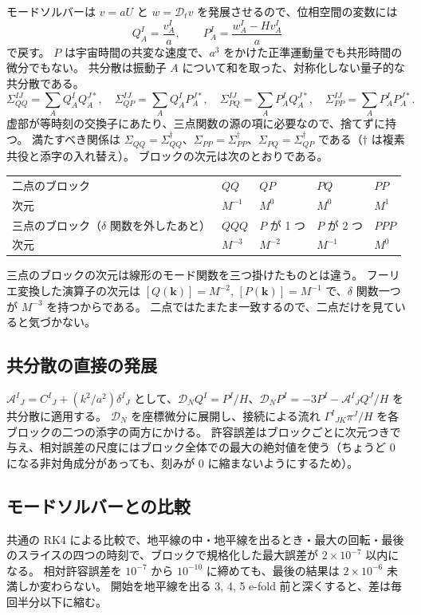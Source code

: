 \documentclass[a4paper,11pt]{ltjsarticle}
\newcommand{\Dt}{\mathcal{D}_t}
\newcommand{\DN}{\mathcal{D}_N}
\begin{document}
モードソルバーは $v=aU$ と $w=\Dt v$ を発展させるので、位相空間の変数には
\[
Q^I_A=\frac{v^I_A}{a},\qquad P^I_A=\frac{w^I_A-Hv^I_A}{a}
\]
で戻す。
$P$ は宇宙時間の共変な速度で、$a^3$ をかけた正準運動量でも共形時間の微分でもない。
共分散は振動子 $A$ について和を取った、対称化しない量子的な共分散である。
\[
\Sigma_{QQ}^{IJ}=\sum_AQ^I_AQ^{J*}_A,\quad
\Sigma_{QP}^{IJ}=\sum_AQ^I_AP^{J*}_A,\quad
\Sigma_{PQ}^{IJ}=\sum_AP^I_AQ^{J*}_A,\quad
\Sigma_{PP}^{IJ}=\sum_AP^I_AP^{J*}_A .
\]
虚部が等時刻の交換子にあたり、三点関数の源の項に必要なので、捨てずに持つ。
満たすべき関係は $\Sigma_{QQ}=\Sigma_{QQ}^\dagger$、$\Sigma_{PP}=\Sigma_{PP}^\dagger$、$\Sigma_{PQ}=\Sigma_{QP}^\dagger$ である（$\dagger$ は複素共役と添字の入れ替え）。
ブロックの次元は次のとおりである。
\begin{center}
\begin{tabular}{lllll}
\toprule
二点のブロック & $QQ$ & $QP$ & $PQ$ & $PP$ \\
次元 & $M^{-1}$ & $M^0$ & $M^0$ & $M^1$ \\
\midrule
三点のブロック（$\delta$ 関数を外したあと） & $QQQ$ & $P$ が 1 つ & $P$ が 2 つ & $PPP$ \\
次元 & $M^{-3}$ & $M^{-2}$ & $M^{-1}$ & $M^0$ \\
\bottomrule
\end{tabular}
\end{center}
三点のブロックの次元は線形のモード関数を三つ掛けたものとは違う。
フーリエ変換した演算子の次元は $[Q(\mathbf k)]=M^{-2}$, $[P(\mathbf k)]=M^{-1}$ で、$\delta$ 関数一つが $M^{-3}$ を持つからである。
二点ではたまたま一致するので、二点だけを見ていると気づかない。

\subsection{共分散の直接の発展}
$\mathcal A^I{}_J=C^I{}_J+(k^2/a^2)\delta^I{}_J$ として、$\DN Q^I=P^I/H$、$\DN P^I=-3P^I-\mathcal A^I{}_JQ^J/H$ を共分散に適用する。
$\DN$ を座標微分に展開し、接続による流れ $\Gamma^I{}_{JK}\pi^J/H$ を各ブロックの二つの添字の両方にかける。
許容誤差はブロックごとに次元つきで与え、相対誤差の尺度にはブロック全体での最大の絶対値を使う（ちょうど 0 になる非対角成分があっても、刻みが 0 に縮まないようにするため）。

\subsection{モードソルバーとの比較}
共通の RK4 による比較で、地平線の中・地平線を出るとき・最大の回転・最後のスライスの四つの時刻で、ブロックで規格化した最大誤差が $2\times10^{-7}$ 以内になる。
相対許容誤差を $10^{-7}$ から $10^{-10}$ に締めても、最後の結果は $2\times10^{-6}$ 未満しか変わらない。
開始を地平線を出る 3, 4, 5 e-fold 前と深くすると、差は毎回半分以下に縮む。
\end{document}
